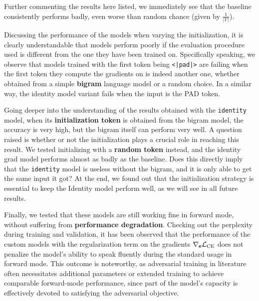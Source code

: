 \documentclass[../thesis.tex]{subfiles}
\begin{document}
Further commenting the results here listed, we immediately see that the baseline consistently performs badly, even worse than random chance (given by $\frac{1}{|\mathcal{V}|}$).

Discussing the performance of the models when varying the initialization, it is clearly understandable that models perform poorly if the evaluation procedure used is different from the one they have been trained on.
Specifically speaking, we observe that models trained with the first token being \texttt{<|pad|>} are failing when the first token they compute the gradients on is indeed another one, whether obtained from a simple \textbf{bigram} language model or a random choice. In a similar way, the identity model variant fails when the input is the PAD token.

Going deeper into the understanding of the results obtained with the \texttt{identity} model, when its \textbf{initialization token} is obtained from the bigram model, the accuracy is very high, but the bigram itself can perform very well.
A question raised is whether or not the initialization plays a crucial role in reaching this result. We tested initializing with a \textbf{random token} instead, and the identity grad model performs almost as badly as the baseline. Does this directly imply that the \texttt{identity} model is useless without the bigram, and it is only able to get the same input it got? At the end, we found out that the initialization strategy is essential to keep the Identity model perform well, as we will see in all future results.

Finally, we tested that these models are still working fine in forward mode, without suffering from \textbf{performance degradation}. Checking out the perplexity during training and validation, it has been observed that the performance of the custom models with the regularization term on the gradients $\nabla_{\mathbf{e}}\mathcal{L}_\text{CE}$ does not penalize the model's ability to speak fluently during the standard usage in forward mode.
This outcome is noteworthy, as adversarial training in literature often necessitates additional parameters or extended training to achieve comparable forward-mode performance, since part of the model’s capacity is effectively devoted to satisfying the adversarial objective.
\end{document}

